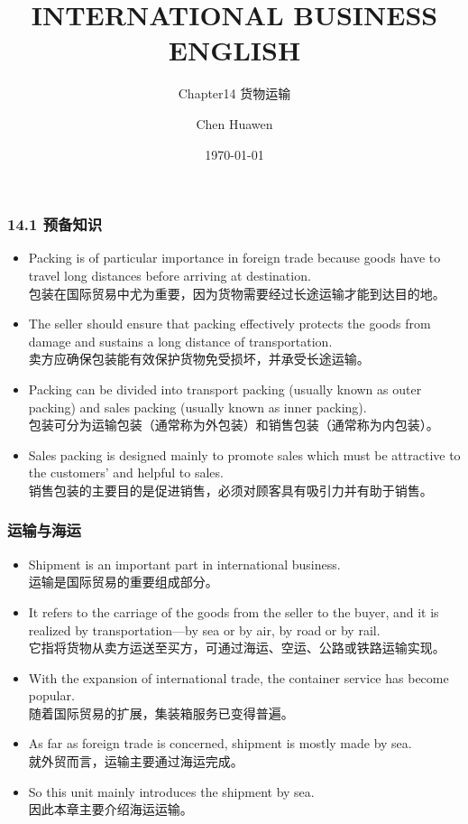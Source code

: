 \documentclass[12pt]{beamer}
\title{INTERNATIONAL BUSINESS ENGLISH}
\subtitle{Chapter14 货物运输}
\date{\today}
\author{Chen Huawen}
\institute{Sanming University}
\begin{document}
\frame{\titlepage}

\begin{frame}[allowframebreaks]
\frametitle{14.1 预备知识}
\begin{itemize}
\item Packing is of particular importance in foreign trade because goods have to travel long distances before arriving at destination. \\
\small{包装在国际贸易中尤为重要，因为货物需要经过长途运输才能到达目的地。}

\item The seller should ensure that packing effectively protects the goods from damage and sustains a long distance of transportation. \\
\small{卖方应确保包装能有效保护货物免受损坏，并承受长途运输。}

\item Packing can be divided into transport packing (usually known as outer packing) and sales packing (usually known as inner packing). \\
\small{包装可分为运输包装（通常称为外包装）和销售包装（通常称为内包装）。}

\item Sales packing is designed mainly to promote sales which must be attractive to the customers’ and helpful to sales. \\
\small{销售包装的主要目的是促进销售，必须对顾客具有吸引力并有助于销售。}
\end{itemize}
\end{frame}

\begin{frame}[allowframebreaks]
\frametitle{运输与海运}
\begin{itemize}
\item Shipment is an important part in international business. \\
\small{运输是国际贸易的重要组成部分。}

\item It refers to the carriage of the goods from the seller to the buyer, and it is realized by transportation—by sea or by air, by road or by rail. \\
\small{它指将货物从卖方运送至买方，可通过海运、空运、公路或铁路运输实现。}

\item With the expansion of international trade, the container service has become popular. \\
\small{随着国际贸易的扩展，集装箱服务已变得普遍。}

\item As far as foreign trade is concerned, shipment is mostly made by sea. \\
\small{就外贸而言，运输主要通过海运完成。}

\item So this unit mainly introduces the shipment by sea. \\
\small{因此本章主要介绍海运运输。}
\end{itemize}
\end{frame}
\end{document}
